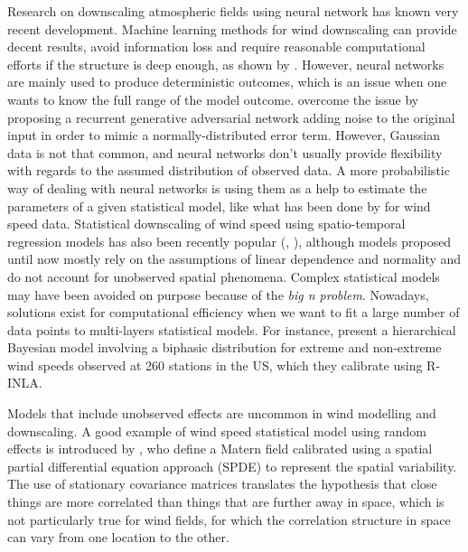 \documentclass[11pt,a4paper]{amsart}
\theoremstyle{plain}
\theoremstyle{definition}
\theoremstyle{remark}
\theoremstyle{remark}
\theoremstyle{definition}
\newcommand{\1}{\mathbbm{1}}
\begin{document}
    Research on downscaling atmospheric fields using neural network has known very recent development. Machine learning methods for wind downscaling can provide decent results, avoid information loss and require reasonable computational efforts if the structure is deep enough, as shown by \cite{hohlein2020comparative}. However, neural networks are mainly used to produce deterministic outcomes, which is an issue when one wants to know the full range of the model outcome. \cite{leinonen2020stochastic} overcome the issue by proposing a recurrent generative adversarial network adding noise to the original input in order to mimic a normally-distributed error term. However, Gaussian data is not that common, and neural networks don't usually provide flexibility with regards to the assumed distribution of observed data. A more probabilistic way of dealing with neural networks is using them as a help to estimate the parameters of a given statistical model, like what has been done by \cite{nerini2020prob} for wind speed data.
    Statistical downscaling of wind speed using spatio-temporal regression models has also been recently popular (\cite{winstral2017statistical}, \cite{ramon2021perfect}), although models proposed until now mostly rely on the assumptions of linear dependence and normality and do not account for unobserved spatial phenomena. Complex statistical models may have been avoided on purpose because of the \textit{big n problem}. Nowadays, solutions exist for computational efficiency when we want to fit a large number of data points to multi-layers statistical models. For instance, \cite{castro2019spliced} present a hierarchical Bayesian model involving a biphasic distribution for extreme and non-extreme wind speeds observed at 260 stations in the US, which they calibrate using R-INLA.
    
    Models that include unobserved effects are uncommon in wind modelling and downscaling. A good example of wind speed statistical model using random effects is introduced by \cite{castro2019spliced}, who define a Matern field calibrated using a spatial partial differential equation approach (SPDE) to represent the spatial variability. The use of stationary covariance matrices translates the hypothesis that close things are more correlated than things that are further away in space, which is not particularly true for wind fields, for which the correlation structure in space can vary from one location to the other.
    
    
     
     
     
\end{document}
